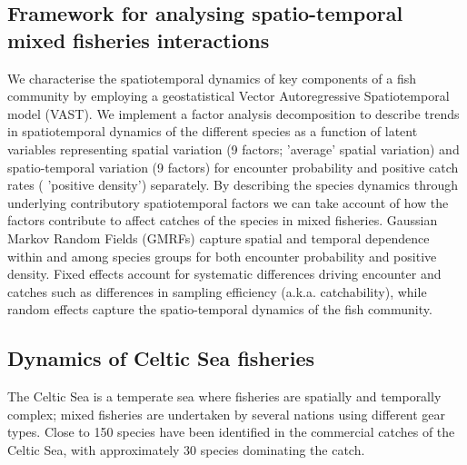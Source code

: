 \documentclass{nature}
\begin{document}
\begin{linenumbers}
\subsection{Framework for analysing spatio-temporal mixed fisheries
	interactions}

 We  characterise
the spatiotemporal dynamics of key components of a fish community by employing
a geostatistical Vector Autoregressive Spatiotemporal model (VAST). We
implement a factor analysis decomposition to describe trends in spatiotemporal
dynamics of the different species as a function of latent variables
\cite{Thorson2015} representing spatial variation (9 factors;  'average' spatial variation) and spatio-temporal variation (9
factors) for encounter probability and positive catch rates ( 'positive density') separately\cite{Thorson2015a}. By
describing the species dynamics through underlying contributory
spatiotemporal factors we can take account of how the factors contribute to
affect catches of the species in mixed fisheries.  Gaussian
Markov Random Fields (GMRFs)  capture spatial and temporal dependence
within and among species groups for both encounter probability and positive
density\cite{Thorson2013}.  Fixed effects  account for systematic differences driving
encounter and catches\deleted{,} such as differences in sampling efficiency (a.k.a.
catchability), while random effects capture the spatio-temporal dynamics of the
fish community.

\subsection{Dynamics of Celtic Sea fisheries}

The Celtic Sea is a temperate sea where fisheries are spatially and temporally
complex; mixed fisheries are undertaken by several nations using different gear
types\cite{Ellis2000, Gerritsen2012}. Close to 150 species have been
identified in the commercial catches of the Celtic Sea, with approximately 30
species dominating the catch\cite{Mateo2016}.


\end{linenumbers}
\end{document}
